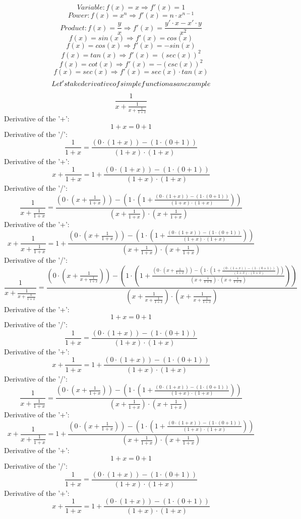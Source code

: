 \documentclass[12pt]{article}
\begin{document}
$$Variable: f(x) = x \Longrightarrow  f'(x) = 1$$
$$Power: f(x) = x^{n} \Longrightarrow  f'(x) = n\cdot x^{n-1}$$
$$Product: f(x) = \frac{y}{x} \Longrightarrow f'(x) = \frac{y'\cdot x - x'\cdot y}{x^{2}}$$$$f(x) = sin(x) \Longrightarrow f'(x) = cos(x)$$
$$f(x) = cos(x) \Longrightarrow f'(x) = -sin(x)$$
$$f(x) = tan(x) \Longrightarrow f'(x) = (sec(x))^{2}$$
$$f(x) = cot(x) \Longrightarrow f'(x) = -(csc(x))^{2}$$
$$f(x) = sec(x) \Longrightarrow f'(x) = sec(x) \cdot tan(x)$$
\newline \newline \bigskip
\begin{align*}
{\Large Let's take derivative of simple function as an example}\end{align*}
$$\frac{1}{x+\frac{1}{x+\frac{1}{1+x}}}$$
Derivative of the '+': $$1+x = 0+1$$
Derivative of the '/': $$\frac{1}{1+x} = \frac{(0\cdot (1+x))-(1\cdot (0+1))}{(1+x)\cdot (1+x)}$$
Derivative of the '+': $$x+\frac{1}{1+x} = 1+\frac{(0\cdot (1+x))-(1\cdot (0+1))}{(1+x)\cdot (1+x)}$$
Derivative of the '/': $$\frac{1}{x+\frac{1}{1+x}} = \frac{(0\cdot (x+\frac{1}{1+x}))-(1\cdot (1+\frac{(0\cdot (1+x))-(1\cdot (0+1))}{(1+x)\cdot (1+x)}))}{(x+\frac{1}{1+x})\cdot (x+\frac{1}{1+x})}$$
Derivative of the '+': $$x+\frac{1}{x+\frac{1}{1+x}} = 1+\frac{(0\cdot (x+\frac{1}{1+x}))-(1\cdot (1+\frac{(0\cdot (1+x))-(1\cdot (0+1))}{(1+x)\cdot (1+x)}))}{(x+\frac{1}{1+x})\cdot (x+\frac{1}{1+x})}$$
Derivative of the '/': $$\frac{1}{x+\frac{1}{x+\frac{1}{1+x}}} = \frac{(0\cdot (x+\frac{1}{x+\frac{1}{1+x}}))-(1\cdot (1+\frac{(0\cdot (x+\frac{1}{1+x}))-(1\cdot (1+\frac{(0\cdot (1+x))-(1\cdot (0+1))}{(1+x)\cdot (1+x)}))}{(x+\frac{1}{1+x})\cdot (x+\frac{1}{1+x})}))}{(x+\frac{1}{x+\frac{1}{1+x}})\cdot (x+\frac{1}{x+\frac{1}{1+x}})}$$
Derivative of the '+': $$1+x = 0+1$$
Derivative of the '/': $$\frac{1}{1+x} = \frac{(0\cdot (1+x))-(1\cdot (0+1))}{(1+x)\cdot (1+x)}$$
Derivative of the '+': $$x+\frac{1}{1+x} = 1+\frac{(0\cdot (1+x))-(1\cdot (0+1))}{(1+x)\cdot (1+x)}$$
Derivative of the '/': $$\frac{1}{x+\frac{1}{1+x}} = \frac{(0\cdot (x+\frac{1}{1+x}))-(1\cdot (1+\frac{(0\cdot (1+x))-(1\cdot (0+1))}{(1+x)\cdot (1+x)}))}{(x+\frac{1}{1+x})\cdot (x+\frac{1}{1+x})}$$
Derivative of the '+': $$x+\frac{1}{x+\frac{1}{1+x}} = 1+\frac{(0\cdot (x+\frac{1}{1+x}))-(1\cdot (1+\frac{(0\cdot (1+x))-(1\cdot (0+1))}{(1+x)\cdot (1+x)}))}{(x+\frac{1}{1+x})\cdot (x+\frac{1}{1+x})}$$
Derivative of the '+': $$1+x = 0+1$$
Derivative of the '/': $$\frac{1}{1+x} = \frac{(0\cdot (1+x))-(1\cdot (0+1))}{(1+x)\cdot (1+x)}$$
Derivative of the '+': $$x+\frac{1}{1+x} = 1+\frac{(0\cdot (1+x))-(1\cdot (0+1))}{(1+x)\cdot (1+x)}$$
\end{document}
